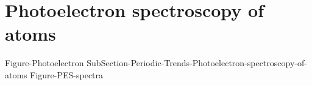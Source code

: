 \documentclass[main.tex]{subfiles}
\begin{document}
\section{Photoelectron spectroscopy of atoms}
{Figure-Photoelectron}%
{SubSection-Periodic-Trends-Photoelectron-spectroscopy-of-atoms}%
{Figure-PES-spectra}%
\newpage









 \checkoddpage\ifoddpage \clearpage\thispagestyle{empty}\mbox{}\clearpage \else  \fi 
\end{document}
